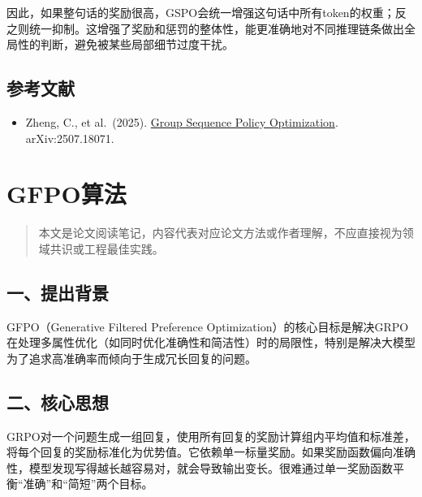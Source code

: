 因此，如果整句话的奖励很高，GSPO会统一增强这句话中所有token的权重；反之则统一抑制。这增强了奖励和惩罚的整体性，能更准确地对不同推理链条做出全局性的判断，避免被某些局部细节过度干扰。

\hypertarget{ux53c2ux8003ux6587ux732e-111}{%
\subsection{参考文献}\label{ux53c2ux8003ux6587ux732e-111}}

\vspace{0.25em}
\begin{itemize}
\tightlist
\item
  Zheng, C., et al.~(2025). \href{https://arxiv.org/abs/2507.18071}{Group Sequence Policy Optimization}. arXiv:2507.18071.
\end{itemize}

\clearpage

\hypertarget{gfpoux7b97ux6cd5}{%
\section{GFPO算法}\label{gfpoux7b97ux6cd5}}

\begin{quote}
本文是论文阅读笔记，内容代表对应论文方法或作者理解，不应直接视为领域共识或工程最佳实践。
\end{quote}

\hypertarget{ux4e00ux63d0ux51faux80ccux666f-2}{%
\subsection{一、提出背景}\label{ux4e00ux63d0ux51faux80ccux666f-2}}

GFPO（Generative Filtered Preference Optimization）的核心目标是解决GRPO在处理多属性优化（如同时优化准确性和简洁性）时的局限性，特别是解决大模型为了追求高准确率而倾向于生成冗长回复的问题。

\hypertarget{ux4e8cux6838ux5fc3ux601dux60f3-2}{%
\subsection{二、核心思想}\label{ux4e8cux6838ux5fc3ux601dux60f3-2}}

GRPO对一个问题生成一组回复，使用所有回复的奖励计算组内平均值和标准差，将每个回复的奖励标准化为优势值。它依赖单一标量奖励。如果奖励函数偏向准确性，模型发现写得越长越容易对，就会导致输出变长。很难通过单一奖励函数平衡``准确''和``简短''两个目标。

